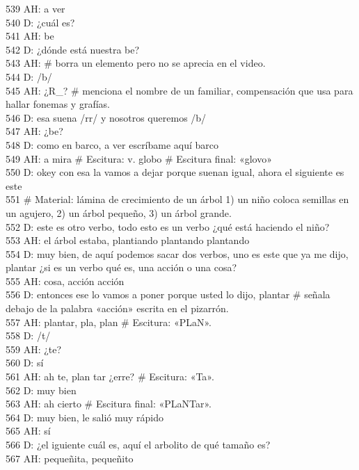 539 AH: a ver\\
540 D: ¿cuál es?\\
541 AH: be\\
542 D: ¿dónde está nuestra be?\\
543 AH: \# borra un elemento pero no se aprecia en el video.\\
544 D: /b/\\
545 AH: ¿R\_? \# menciona el nombre de un familiar, compensación que usa para hallar fonemas y grafías.\\
546 D: esa suena /rr/ y nosotros queremos /b/\\
547 AH: ¿be?\\
548 D: como en barco, a ver escríbame aquí barco\\
549 AH: a mira \# Escitura: v. globo \# Escitura final: «glovo»\\
550 D: okey con esa la vamos a dejar porque suenan igual, ahora el siguiente es este \\
551 \# Material: lámina de crecimiento de un árbol 1) un niño coloca semillas en un agujero, 2) un árbol pequeño, 3) un árbol grande.\\
552 D: este es otro verbo, todo esto es un verbo ¿qué está haciendo el niño?\\
553 AH: el árbol estaba, plantiando plantando plantando\\
554 D: muy bien, de aquí podemos sacar dos verbos, uno es este que ya me dijo, plantar ¿si es un verbo qué es, una acción o una cosa?\\
555 AH: cosa, acción acción\\
556 D: entonces ese lo vamos a poner porque usted lo dijo, plantar \# señala debajo de la palabra «acción» escrita en el pizarrón.\\
557 AH: plantar, pla, plan \# Escitura: «PLaN».\\
558 D: /t/\\
559 AH: ¿te?\\
560 D: sí\\
561 AH: ah te, plan tar ¿erre? \# Escitura: «Ta».\\
562 D: muy bien\\
563 AH: ah cierto \# Escitura final: «PLaNTar».\\
564 D: muy bien, le salió muy rápido\\
565 AH: sí\\
566 D: ¿el iguiente cuál es, aquí el arbolito de qué tamaño es?\\
567 AH: pequeñita, pequeñito\\
